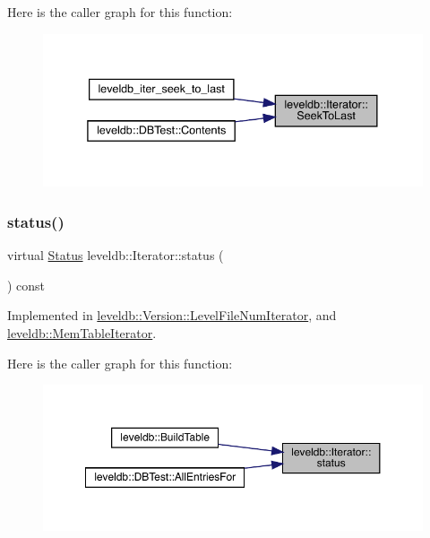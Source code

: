 Here is the caller graph for this function\+:
\nopagebreak
\begin{figure}[H]
\begin{center}
\leavevmode
\includegraphics[width=338pt]{classleveldb_1_1_iterator_a8ad637f0a759e6d94cca6c5b4db440d3_icgraph}
\end{center}
\end{figure}
\mbox{\label{classleveldb_1_1_iterator_ac84f34623a031b7eeb23409320f76376}} 
\subsubsection{\texorpdfstring{status()}{status()}}
{\footnotesize\ttfamily virtual \mbox{\hyperlink{classleveldb_1_1_status}{Status}} leveldb\+::\+Iterator\+::status (\begin{DoxyParamCaption}{ }\end{DoxyParamCaption}) const\hspace{0.3cm}{\ttfamily [pure virtual]}}



Implemented in \mbox{\hyperlink{classleveldb_1_1_version_1_1_level_file_num_iterator_a173217ee0e689944ba052b1d07d2e58a}{leveldb\+::\+Version\+::\+Level\+File\+Num\+Iterator}}, and \mbox{\hyperlink{classleveldb_1_1_mem_table_iterator_af9bc5f041cd319cfb44408d6bf5aa4a2}{leveldb\+::\+Mem\+Table\+Iterator}}.

Here is the caller graph for this function\+:
\nopagebreak
\begin{figure}[H]
\begin{center}
\leavevmode
\includegraphics[width=350pt]{classleveldb_1_1_iterator_ac84f34623a031b7eeb23409320f76376_icgraph}
\end{center}
\end{figure}
\mbox{\label{classleveldb_1_1_iterator_a38614978bfa0586327b8e237bcb46012}} 
